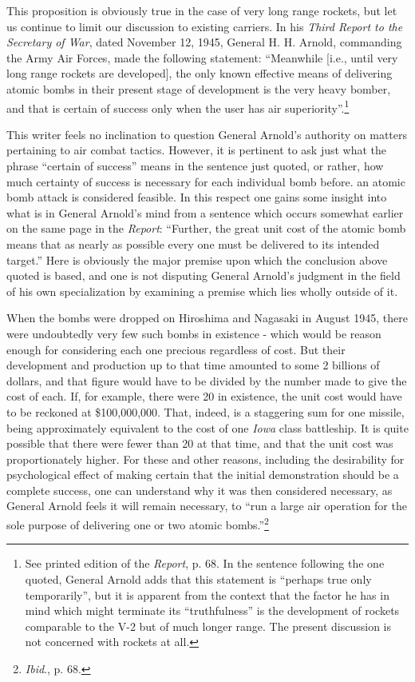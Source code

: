This proposition is obviously true in the case of very long range rockets, but let us continue to limit our discussion to existing carriers. In his \textit{Third Report to the Secretary of War}, dated November 12, 1945, General H. H. Arnold, commanding the Army Air Forces, made the following statement: ``Meanwhile [i.e., until very long range rockets are developed], the only known effective means of delivering atomic bombs in their present stage of development is the very heavy bomber, and that is certain of success only when the user has air superiority''.\footnote{See printed edition of the \textit{Report}, p. 68. In the sentence following the one quoted, General Arnold adds that this statement is ``perhaps true only temporarily'', but it is apparent from the context that the factor he has in mind which might terminate its ``truthfulness'' is the development of rockets comparable to the V-2 but of much longer range. The present discussion is not concerned with rockets at all.}

This writer feels no inclination to question General Arnold's authority on matters pertaining to air combat tactics. However, it is pertinent to ask just what the phrase ``certain of success'' means in the sentence just quoted, or rather, how much certainty of success is necessary for each individual bomb before. an atomic bomb attack is considered feasible. In this respect one gains some insight into what is in General Arnold's mind from a sentence which occurs somewhat earlier on the same page in the \textit{Report}: ``Further, the great unit cost of the atomic bomb means that as nearly as possible every one must be delivered to its intended target.'' Here is obviously the major premise upon which the conclusion above quoted is based, and one is not disputing General Arnold's judgment in the field of his own specialization by examining a premise which lies wholly outside of it.

When the bombs were dropped on Hiroshima and Nagasaki in August 1945, there were undoubtedly very few such bombs in existence - which would be reason enough for considering each one precious regardless of cost. But their development and production up to that time amounted to some 2 billions of dollars, and that figure would have to be divided by the number made to give the cost of each. If, for example, there were 20 in existence, the unit cost would have to be reckoned at \$100,000,000. That, indeed, is a staggering sum for one missile, being approximately equivalent to the cost of one \emph{Iowa} class battleship. It is quite possible that there were fewer than 20 at that time, and that the unit cost was proportionately higher. For these and other reasons, including the desirability for psychological effect of making certain that the initial demonstration should be a complete success, one can understand why it was then considered necessary, as General Arnold feels it will remain necessary, to ``run a large air operation for the sole purpose of delivering one or two atomic bombs.''\footnote{\emph{Ibid}., p. 68.}

